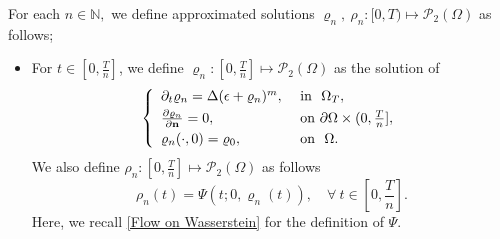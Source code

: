 \documentclass{amsart}
\numberwithin{equation}{section}
\begin{document}
For each $n\in \mathbb{N},$ we define approximated solutions
$\varrho_n,~ \rho_n:[0,T)\mapsto \mathcal{P}_{2}(\Omega)$ as follows;
\begin{itemize}

\item
 For $t\in [0,\frac{T}{n}]$, we define $\varrho_n:[0,\frac{T}{n}]\mapsto \mathcal{P}_{2}(\Omega)$ as the solution of
\begin{equation*}\label{eq 1 : splitting}
  \left\{
  \begin{array}{ll}
  \partial_t \varrho_n =   \Delta (\epsilon +\varrho_n)^m, & \text{ in } \ \Omega_{T},  \vspace{1mm}\\
  \frac{\partial\varrho_n}{\partial\mathbf{n}} = 0, & \text{ on } \partial \Omega \times (0, \frac{T}{n}],  \vspace{1mm}\\
  \varrho_n(\cdot,0)=\varrho_0, & \text{ on } \ \Omega.
  \end{array}
  \right.
\end{equation*}
We also define  $\rho_n:[0,\frac{T}{n}]\mapsto
\mathcal{P}_{2}(\Omega)$ as follows
\begin{equation*}
\rho_n(t)= \Psi(t;0, \varrho_n(t)), \quad \forall ~ t \in [0, \frac
T n].
\end{equation*}
Here, we recall \eqref{Flow on Wasserstein} for the definition of $\Psi$. %


\end{itemize}
\end{document}
